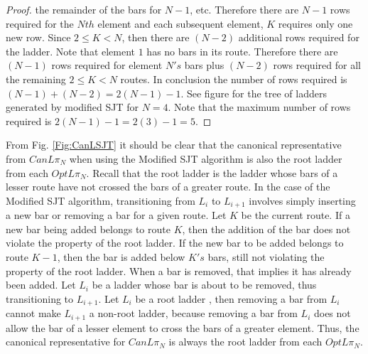 \begin{proof}
  the remainder of the bars for $N-1$, etc. Therefore there are $N-1$ rows required for the $Nth$ element and each subsequent 
  element, $K$ requires only one new row. Since $2 \leq K < N$, then there are $(N-2)$ additional rows required for the ladder. Note that element 
  $1$ has no bars in its route. Therefore there are $(N-1)$ rows required for element $N's$ bars  plus $(N-2)$ rows required for 
  all the remaining $2 \leq K < N$ routes. In conclusion the number of rows required is $(N-1) + (N-2) = 2(N-1)-1$. See figure for the tree of ladders 
  generated by modified SJT for $N=4$. Note that the maximum number of rows required is $2(N-1)-1=2(3)-1=5$.
\end{proof}





From Fig. \ref{Fig:CanLSJT} it should be clear that the canonical representative from $CanL{\pi_{N}}$ when using the 
Modified SJT algorithm is also the root ladder from each $OptL{\pi_{N}}$. Recall that the root ladder is the 
ladder whose bars of a lesser route have not crossed the bars of a greater route. In the case of the 
Modified SJT algorithm, transitioning from $L_{i}$ to $L_{i+1}$ involves simply inserting a new bar 
or removing a bar for a given route. Let $K$ be the current route. If a new bar being added belongs to 
route $K$, then the addition of the bar does not violate the property of the root ladder. If the new bar to
be added belongs to route $K-1$, then the bar is added below $K's$ bars, still not violating the property of 
the root ladder. When a bar is removed, that implies it has already been added. Let $L_{i}$ be a 
ladder whose bar is about to be removed, thus transitioning to $L_{i+1}$. Let $L_{i}$ be a root ladder
, then removing a bar from $L_{i}$ cannot make $L_{i+1}$ a non-root ladder, because 
removing a bar from $L_{i}$ does not allow the bar of a lesser element to cross the bars of a greater element.
Thus, the canonical representative for $CanL{\pi_{N}}$ is always the root ladder from each $OptL{\pi_{N}}$.\par 



